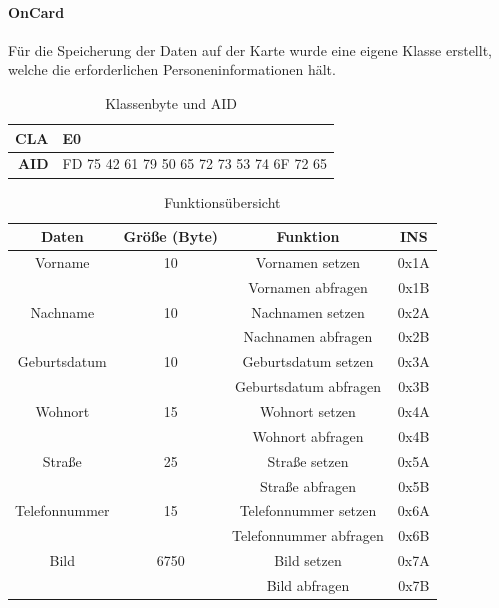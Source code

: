 \documentclass[	a4paper,
			11pt,
			oneside,
			parskip]{scrartcl}
\begin{document}
\paragraph{OnCard} Für die Speicherung der Daten auf der Karte wurde eine eigene  Klasse erstellt, welche die erforderlichen Personeninformationen hält.

\begin{table}[htbp]
  \centering
  \caption{Klassenbyte und AID}
    \begin{tabular}{rr}
    \toprule
    \textbf{CLA} & \multicolumn{1}{l}{E0} \\
    \midrule
    \textbf{AID} & FD 75 42 61 79 50 65 72 73 53 74 6F 72 65 \\
    \bottomrule
    \end{tabular}%
  \label{tab:addlabel}%
\end{table}%

\begin{table}[H]
  \centering
  \caption{Funktionsübersicht}
    \begin{tabular}{crcc}
    \toprule
    \textbf{Daten} & \multicolumn{1}{c}{\textbf{Größe (Byte)}} & \textbf{Funktion} & \textbf{INS} \\
    \midrule
    Vorname & \multicolumn{1}{c}{10} & Vornamen setzen & 0x1A \\
          & \multicolumn{1}{c}{} & Vornamen abfragen & 0x1B \\
    Nachname & \multicolumn{1}{c}{10} & Nachnamen setzen & 0x2A \\
          & \multicolumn{1}{c}{} & Nachnamen abfragen & 0x2B \\
    Geburtsdatum & \multicolumn{1}{c}{10} & Geburtsdatum setzen & 0x3A \\
          & \multicolumn{1}{c}{} & Geburtsdatum abfragen & 0x3B \\
    Wohnort & \multicolumn{1}{c}{15} & Wohnort setzen & 0x4A \\
          & \multicolumn{1}{c}{} & Wohnort abfragen & 0x4B \\
    Straße & \multicolumn{1}{c}{25} & Straße setzen & 0x5A \\
          & \multicolumn{1}{c}{} & Straße abfragen & 0x5B \\
    Telefonnummer & \multicolumn{1}{c}{15} & Telefonnummer setzen & 0x6A \\
          & \multicolumn{1}{c}{} & Telefonnummer abfragen & 0x6B \\
    Bild  & \multicolumn{1}{c}{6750} & Bild setzen & 0x7A \\
          &       & Bild abfragen & 0x7B \\
    \bottomrule
    \end{tabular}%
  \label{tab:persdata}%
\end{table}%
\end{document}
